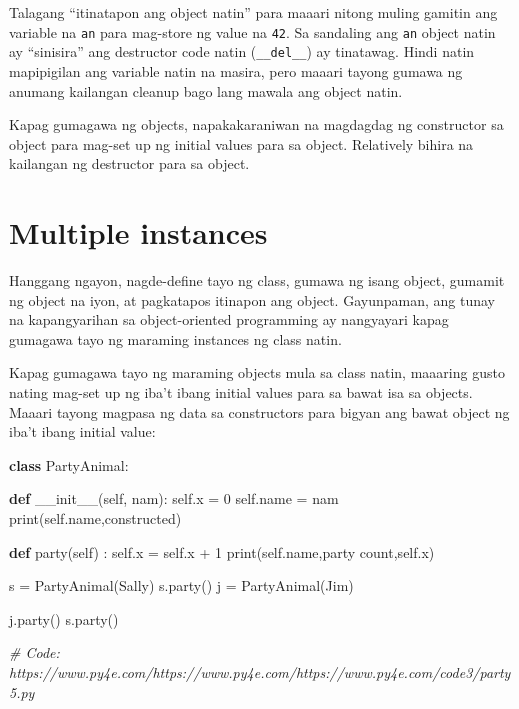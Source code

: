\documentclass[10pt,]{book}
\newenvironment{Shaded}{}{}
\newcommand{\BuiltInTok}[1]{\textcolor[rgb]{0.00,0.50,0.00}{#1}}
\newcommand{\CommentTok}[1]{\textcolor[rgb]{0.38,0.63,0.69}{\textit{#1}}}
\newcommand{\DecValTok}[1]{\textcolor[rgb]{0.25,0.63,0.44}{#1}}
\newcommand{\FunctionTok}[1]{\textcolor[rgb]{0.02,0.16,0.49}{#1}}
\newcommand{\KeywordTok}[1]{\textcolor[rgb]{0.00,0.44,0.13}{\textbf{#1}}}
\newcommand{\NormalTok}[1]{#1}
\newcommand{\OperatorTok}[1]{\textcolor[rgb]{0.40,0.40,0.40}{#1}}
\newcommand{\StringTok}[1]{\textcolor[rgb]{0.25,0.44,0.63}{#1}}
\newcommand{\VariableTok}[1]{\textcolor[rgb]{0.10,0.09,0.49}{#1}}
\begin{document}
Talagang ``itinatapon ang object natin'' para maaari nitong muling
gamitin ang variable na \texttt{an} para mag-store ng value na
\texttt{42}. Sa sandaling ang \texttt{an} object natin ay ``sinisira''
ang destructor code natin (\texttt{\_\_del\_\_}) ay tinatawag. Hindi
natin mapipigilan ang variable natin na masira, pero maaari tayong
gumawa ng anumang kailangan cleanup bago lang mawala ang object natin.

Kapag gumagawa ng objects, napakakaraniwan na magdagdag ng constructor
sa object para mag-set up ng initial values para sa object. Relatively
bihira na kailangan ng destructor para sa object.

\section{Multiple instances}\label{multiple-instances}

Hanggang ngayon, nagde-define tayo ng class, gumawa ng isang object,
gumamit ng object na iyon, at pagkatapos itinapon ang object.
Gayunpaman, ang tunay na kapangyarihan sa object-oriented programming ay
nangyayari kapag gumagawa tayo ng maraming instances ng class natin.

Kapag gumagawa tayo ng maraming objects mula sa class natin, maaaring
gusto nating mag-set up ng iba't ibang initial values para sa bawat isa
sa objects. Maaari tayong magpasa ng data sa constructors para bigyan
ang bawat object ng iba't ibang initial value:

\begin{Shaded}
\begin{Highlighting}[]
\KeywordTok{class}\NormalTok{ PartyAnimal:}

   \KeywordTok{def} \FunctionTok{\_\_init\_\_}\NormalTok{(}\VariableTok{self}\NormalTok{, nam):}
     \VariableTok{self}\NormalTok{.x }\OperatorTok{=} \DecValTok{0}
     \VariableTok{self}\NormalTok{.name }\OperatorTok{=}\NormalTok{ nam}
     \BuiltInTok{print}\NormalTok{(}\VariableTok{self}\NormalTok{.name,}\StringTok{\textquotesingle{}constructed\textquotesingle{}}\NormalTok{)}

   \KeywordTok{def}\NormalTok{ party(}\VariableTok{self}\NormalTok{) :}
     \VariableTok{self}\NormalTok{.x }\OperatorTok{=} \VariableTok{self}\NormalTok{.x }\OperatorTok{+} \DecValTok{1}
     \BuiltInTok{print}\NormalTok{(}\VariableTok{self}\NormalTok{.name,}\StringTok{\textquotesingle{}party count\textquotesingle{}}\NormalTok{,}\VariableTok{self}\NormalTok{.x)}

\NormalTok{s }\OperatorTok{=}\NormalTok{ PartyAnimal(}\StringTok{\textquotesingle{}Sally\textquotesingle{}}\NormalTok{)}
\NormalTok{s.party()}
\NormalTok{j }\OperatorTok{=}\NormalTok{ PartyAnimal(}\StringTok{\textquotesingle{}Jim\textquotesingle{}}\NormalTok{)}

\NormalTok{j.party()}
\NormalTok{s.party()}

\CommentTok{\# Code: https://www.py4e.com/https://www.py4e.com/https://www.py4e.com/code3/party5.py}
\end{Highlighting}
\end{Shaded}
\end{document}
